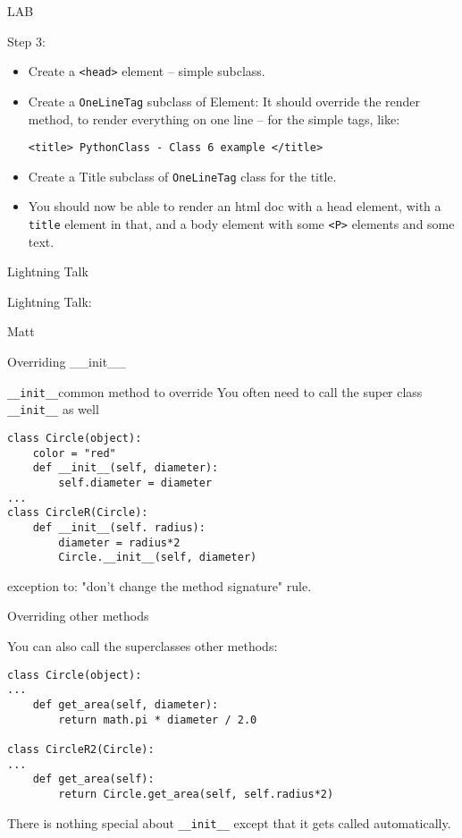 \documentclass{beamer}
\begin{document}
\begin{frame}[fragile]{LAB}

\vfill
{\Large Step 3:}

\begin{itemize}
  \item Create a \verb|<head>| element -- simple subclass.
  \item Create a \verb|OneLineTag| subclass of Element:
        It should override the render method, to render everything on one line --
        for the simple tags, like:
    
        \verb|<title> PythonClass - Class 6 example </title>|
  \item Create a Title subclass of \verb|OneLineTag| class for the title.
  
  \item You should now be able to render an html doc with a head element, with
       a \verb|title| element in that, and a body element with some \verb|<P>|
       elements and some text.
\end{itemize}

\end{frame}


\begin{frame}{Lightning Talk}

{\centering

\vfill
{\LARGE Lightning Talk:  }

\vfill
{\Huge Matt}

\vfill
}
\end{frame}

\begin{frame}[fragile]{Overriding \_\_init\_\_}

{\Large \verb|__init__|common method to override}
\vfill
{\large You often need to call the super class \verb|__init__| as well}
\vfill
\begin{verbatim}
class Circle(object):
    color = "red"
    def __init__(self, diameter):
        self.diameter = diameter
...
class CircleR(Circle):
    def __init__(self. radius):
        diameter = radius*2
        Circle.__init__(self, diameter)
\end{verbatim}
\vfill
exception to: "don't change the method signature" rule.
\end{frame} 

\begin{frame}[fragile]{Overriding other methods}

{\large You can also call the superclasses other methods:}
\vfill
\begin{verbatim}
class Circle(object):
...
    def get_area(self, diameter):
        return math.pi * diameter / 2.0

class CircleR2(Circle):
...
    def get_area(self):
        return Circle.get_area(self, self.radius*2)
\end{verbatim}

\vfill
There is nothing special about \verb|__init__| except that it gets called automatically.
\end{frame} 
\end{document}
